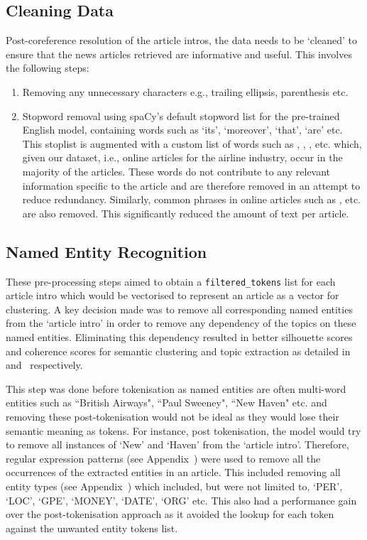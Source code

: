 \subsection{Cleaning Data} \label{data_cleaning}
Post-coreference resolution of the article intros, the data needs to be `cleaned' to ensure that the news articles retrieved are informative and useful. This involves the following steps: 
\begin{enumerate}
    \item Removing any unnecessary characters e.g., trailing ellipsis, parenthesis etc.
    \item Stopword removal using spaCy's default stopword list for the pre-trained English model, containing words such as `its', `moreover', `that', `are' etc. This stoplist is augmented with a custom list of words such as , , ,  etc. which, given our dataset, i.e., online articles for the airline industry, occur in the majority of the articles. These words do not contribute to any relevant information specific to the article and are therefore removed in an attempt to reduce redundancy. Similarly, common phrases in online articles such as ,  etc. are also removed. This significantly reduced the amount of text per article.

\end{enumerate}

\subsection{Named Entity Recognition}
These pre-processing steps aimed to obtain a \texttt{filtered\_tokens} list for each article intro which would be vectorised to represent an article as a vector for clustering. A key decision made was to remove all corresponding named entities from the `article intro' in order to remove any dependency of the topics on these named entities. Eliminating this dependency resulted in better silhouette scores and coherence scores for semantic clustering and topic extraction as detailed in~ and~ respectively. 

This step was done before tokenisation as named entities are often multi-word entities such as ``British Airways", ``Paul Sweeney", ``New Haven" etc. and removing these post-tokenisation would not be ideal as they would lose their semantic meaning as tokens. For instance, post tokenisation, the model would try to remove all instances of `New' and `Haven' from the `article intro'. Therefore, regular expression patterns (see Appendix~) were used to remove all the occurrences of the extracted entities in an article. This included removing all entity types (see Appendix~) which included, but were not limited to, `PER', `LOC', `GPE', `MONEY', `DATE', `ORG' etc. This also had a performance gain over the post-tokenisation approach as it avoided the lookup for each token against the unwanted entity tokens list.

